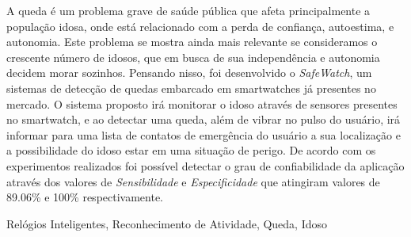 A queda é um problema grave de saúde pública que afeta principalmente a população idosa, onde está relacionado com a perda de confiança, autoestima, e autonomia. Este problema se mostra ainda mais relevante se consideramos o crescente número de idosos, que em busca de sua independência e autonomia decidem morar sozinhos. Pensando nisso, foi desenvolvido o \textit{SafeWatch}, um sistemas de detecção de quedas embarcado em smartwatches já presentes no mercado. O sistema proposto irá monitorar o idoso através de sensores presentes no smartwatch, e ao detectar uma queda, além de vibrar no pulso do usuário, irá informar para uma lista de contatos de emergência do usuário a sua localização e a possibilidade do idoso estar em uma situação de perigo. De acordo com os experimentos realizados foi possível detectar o grau de confiabilidade da aplicação através dos valores de \textit{Sensibilidade} e \textit{Especificidade} que atingiram valores de 89.06\% e 100\% respectivamente. 


\begin{keywords}
	Relógios Inteligentes, Reconhecimento de Atividade, Queda, Idoso
\end{keywords}